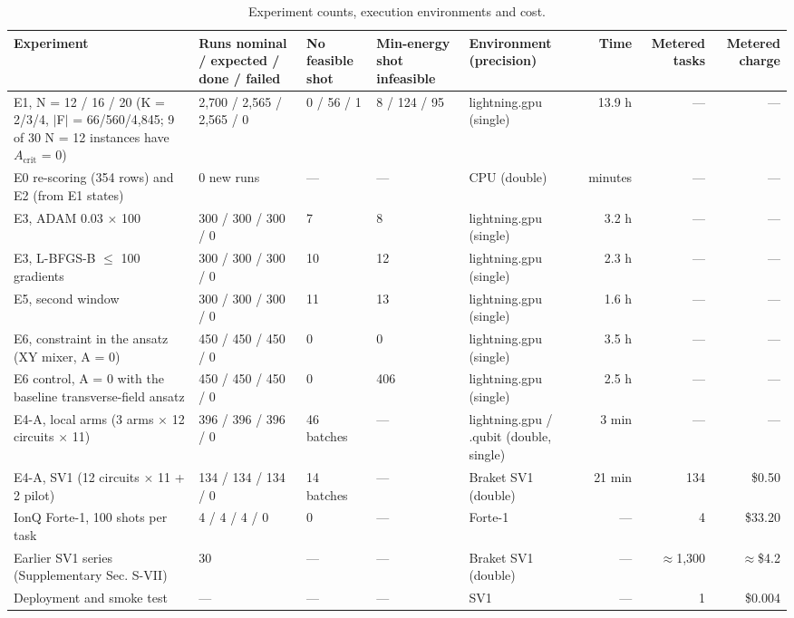 \documentclass{ieeeaccess}
\begin{document}
\begin{table}[!t]
\centering
\scriptsize
\caption{Experiment counts, execution environments and cost.}
\label{tab:II}
\begin{tabular}{p{}p{}p{}p{}p{}rrr}
\toprule
Experiment & Runs nominal / expected / done / failed & No feasible shot & Min-energy shot infeasible & Environment (precision) & Time & Metered tasks & Metered charge \\
\midrule
E1, N = 12 / 16 / 20 (K = 2/3/4, $|$F$|$ = 66/560/4,845; 9 of 30 N = 12 instances have $A_{\mathrm{crit}}$ = 0) & 2,700 / 2,565 / 2,565 / 0 & 0 / 56 / 1 & 8 / 124 / 95 & lightning.gpu (single) & 13.9 h & --- & --- \\
E0 re-scoring (354 rows) and E2 (from E1 states) & 0 new runs & --- & --- & CPU (double) & minutes & --- & --- \\
E3, ADAM 0.03 $\times$ 100 & 300 / 300 / 300 / 0 & 7 & 8 & lightning.gpu (single) & 3.2 h & --- & --- \\
E3, L-BFGS-B $\leq$ 100 gradients & 300 / 300 / 300 / 0 & 10 & 12 & lightning.gpu (single) & 2.3 h & --- & --- \\
E5, second window & 300 / 300 / 300 / 0 & 11 & 13 & lightning.gpu (single) & 1.6 h & --- & --- \\
E6, constraint in the ansatz (XY mixer, A = 0) & 450 / 450 / 450 / 0 & 0 & 0 & lightning.gpu (single) & 3.5 h & --- & --- \\
E6 control, A = 0 with the baseline transverse-field ansatz & 450 / 450 / 450 / 0 & 0 & 406 & lightning.gpu (single) & 2.5 h & --- & --- \\
E4-A, local arms (3 arms $\times$ 12 circuits $\times$ 11) & 396 / 396 / 396 / 0 & 46 batches & --- & lightning.gpu / .qubit (double, single) & 3 min & --- & --- \\
E4-A, SV1 (12 circuits $\times$ 11 + 2 pilot) & 134 / 134 / 134 / 0 & 14 batches & --- & Braket SV1 (double) & 21 min & 134 & \$0.50 \\
IonQ Forte-1, 100 shots per task & 4 / 4 / 4 / 0 & 0 & --- & Forte-1 & --- & 4 & \$33.20 \\
Earlier SV1 series (Supplementary Sec. S-VII) & 30 & --- & --- & Braket SV1 (double) & --- & $\approx$1,300 & $\approx$\$4.2 \\
Deployment and smoke test & --- & --- & --- & SV1 & --- & 1 & \$0.004 \\
\bottomrule
\end{tabular}
\end{table}
\end{document}
